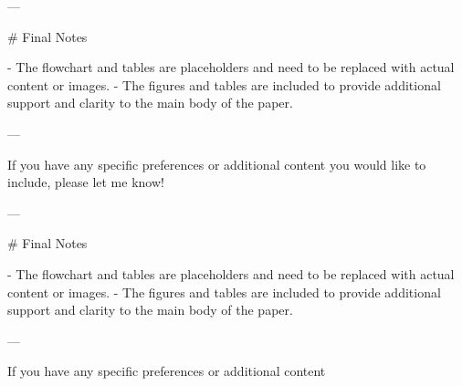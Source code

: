 ---

# Final Notes

- The flowchart and tables are placeholders and need to be replaced with actual content or images.
- The figures and tables are included to provide additional support and clarity to the main body of the paper.

---

If you have any specific preferences or additional content you would like to include, please let me know! 

---

# Final Notes

- The flowchart and tables are placeholders and need to be replaced with actual content or images.
- The figures and tables are included to provide additional support and clarity to the main body of the paper.

---

If you have any specific preferences or additional content